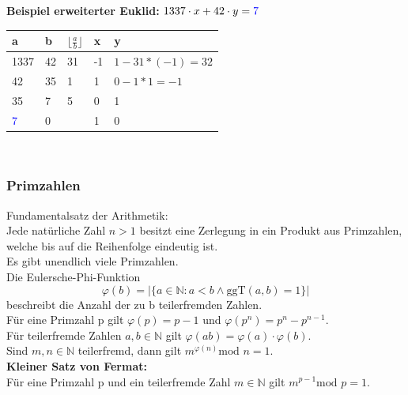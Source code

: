 \documentclass[a4paper,12pt,leqno]{article}
\newcommand{\blue}[1]{\textcolor{blue}{#1}}
\begin{document}
\textbf{Beispiel erweiterter Euklid:}
$1337\cdot x+42\cdot y=\blue{7}$\\
\begin{tabular}{|l|l|l|l|l|}
\hline
a & b & $\lfloor \frac{a}{b} \rfloor$ & x & y\\
\hline
1337 & 42 & 31 & -1 & $1-31*(-1)=32$\\
\hline
42 & 35 & 1 & 1 & $0-1*1=-1$\\
\hline
35 & 7 & 5 & 0 & 1\\
\hline
\blue{7} & 0 & & 1 & 0\\
\hline
\end{tabular}\\
\subsubsection{Primzahlen}
Fundamentalsatz der Arithmetik:\\
Jede natürliche Zahl $n>1$ besitzt eine Zerlegung in ein Produkt aus Primzahlen, welche bis auf die Reihenfolge eindeutig ist.\\
Es gibt unendlich viele Primzahlen.\\

Die Eulersche-Phi-Funktion $$\varphi (b)=|\{a\in\mathbb{N} : a < b\wedge \textrm{ggT}(a,b)=1\}|$$ beschreibt die Anzahl der zu b teilerfremden Zahlen.\\
Für eine Primzahl p gilt $\varphi (p)=p-1$ und $\varphi (p^n)=p^n-p^{n-1}$.\\
Für teilerfremde Zahlen $a,b\in \mathbb{N}$ gilt $\varphi (ab)=\varphi (a)\cdot \varphi (b)$.\\
Sind $m,n\in \mathbb{N}$ teilerfremd, dann gilt $m^{\varphi (n)}\textrm{mod }n= 1$.\\
\textbf{Kleiner Satz von Fermat:}\\
Für eine Primzahl p und ein teilerfremde Zahl $m\in \mathbb{N}$ gilt $m^{p-1} \textrm{mod }p = 1$.
\end{document}
